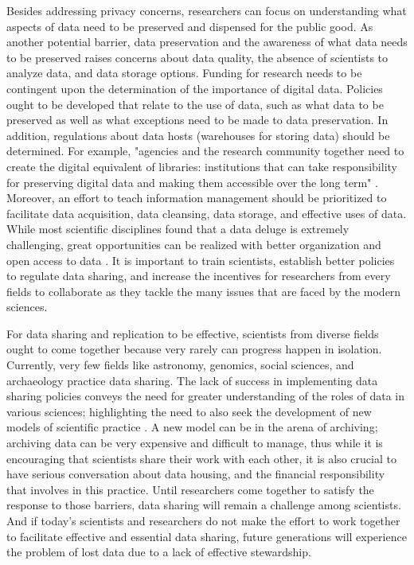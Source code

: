 \documentclass[sigconf]{acmart}
\begin{document}
Besides addressing privacy concerns, researchers can focus on understanding what aspects of data need to be preserved and dispensed for the public good. As another potential barrier, data preservation and the awareness of what data needs to be preserved raises concerns about data quality, the absence of scientists to analyze data, and data storage options. Funding for research needs to be contingent upon the determination of the importance of digital data. Policies ought to be developed that relate to the use of data, such as what data to be preserved as well as what exceptions need to be made to data preservation. In addition, regulations about data hosts (warehouses for storing data) should be determined. For example, "agencies and the research community together need to create the digital equivalent of libraries: institutions that can take responsibility for preserving digital data and making them accessible over the long term" \cite{pryor2009skilling}.  Moreover, an effort to teach information management should be prioritized to facilitate data acquisition, data cleansing, data storage, and effective uses of data. While most scientific disciplines found that a data deluge is extremely challenging, great opportunities can be realized with better organization and open access to data \cite{economic22challenges}. It is important to train scientists, establish better policies to regulate data sharing, and increase the incentives for researchers from every fields to collaborate as they tackle the many issues that are faced by the modern sciences.


For data sharing and replication to be effective, scientists from diverse fields ought to come together because very rarely can progress happen in isolation. Currently, very few fields like astronomy, genomics, social sciences, and archaeology practice data sharing. The lack of success in implementing data sharing policies conveys the need for greater understanding of the roles of data in various sciences; highlighting the need to also seek the development of new models of scientific practice \cite{borgman2015if}. A new model can be in the arena of archiving; archiving data can be very expensive and difficult to manage, thus while it is encouraging that scientists share their work with each other, it is also crucial to have serious conversation about data housing, and the financial responsibility that involves in this practice. Until researchers come together to satisfy the response to those barriers, data sharing will remain a challenge among scientists. And if today's scientists and researchers do not make the effort to work together to facilitate effective and essential data sharing, future generations will experience the problem of lost data due to a lack of effective stewardship. 
\end{document}
